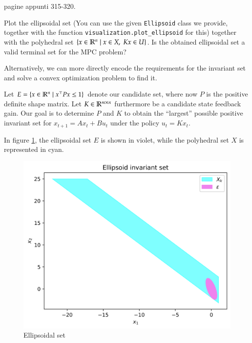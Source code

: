 \documentclass[]{article}
\begin{document}
\begin{flushleft}
	pagine appunti 315-320.
\end{flushleft}



\begin{assignment}
	Plot the ellipsoidal set 
	(You can use the given \texttt{Ellipsoid} class we provide,
	together with the function \texttt{visualization.plot\_ellipsoid} for this)
	together with the polyhedral set $\{ x \in \mathbb{R}^n \mid x \in X,\; Kx \in U \}$.
	Is the obtained ellipsoidal set a valid terminal set for the MPC problem?
\end{assignment}


Alternatively, we can more directly encode the requirements for the 
invariant set and solve a convex optimization problem 
to find it. 

Let $E = \{ x \in \mathbb{R}^n \mid x^\top P x \leq 1 \}$ denote our candidate set, where 
now $P$ is the positive definite shape matrix. 
Let $K \in \mathbb{R}^{m \times n}$ furthermore be a candidate state feedback gain.
Our goal is to determine 
$P$ and $K$ to obtain the ``largest'' possible positive invariant set for 
$x_{t+1} = A x_t + B u_t$ under the policy $u_t = K x_t$.


\begin{flushleft}
	In figure \ref{fig:assignment3_2}, the ellipsoidal set $E$ is shown in violet, while the polyhedral set $X$ is represented in cyan. 
\end{flushleft}
\begin{figure}[H]
    \centering
    \begin{minipage}{0.5\textwidth}
        \centering
        \includegraphics[width=\textwidth]{images/Assignment_32.png}
        \caption{Ellipsoidal set}
        \label{fig:assignment3_2}
    \end{minipage}
\end{figure}
\end{document}
